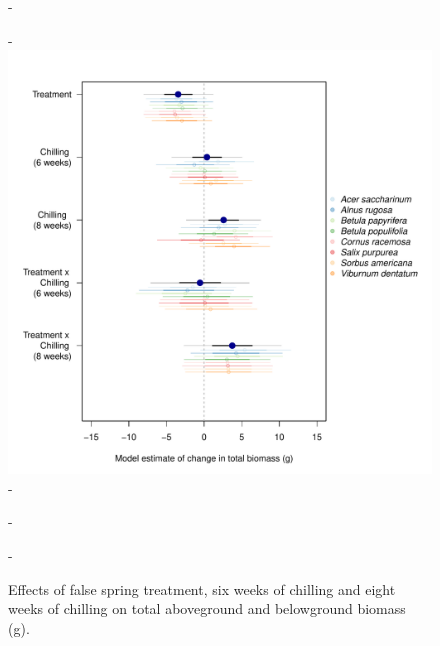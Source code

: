 \documentclass{article}\usepackage[]{graphicx}\usepackage[]{color}
\begin{document}
{\begin{figure} [H]
  -\begin{center}
  -\includegraphics[width=14cm]{..//analyses/figures/totbiomass50and90_brms.pdf} 
  -\caption{Effects of false spring treatment, six weeks of chilling and eight weeks of chilling on total aboveground and belowground biomass (g). }\label{fig:mutotbio}
  -\end{center}
  -\end{figure}}

\end{document}
